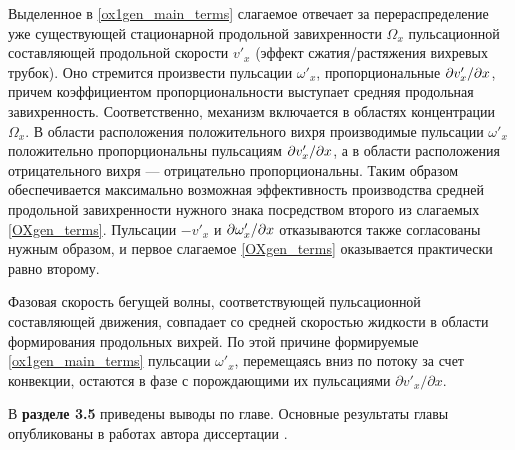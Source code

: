 Выделенное в \eqref{ox1gen_main_terms} слагаемое отвечает за перераспределение уже существующей стационарной продольной завихренности $\Omega_x$ пульсационной составляющей продольной скорости $v'_x$ (эффект сжатия/растяжения вихревых трубок). Оно стремится произвести пульсации $\omega'_x$, пропорциональные $\partial v'_x / \partial x$, причем коэффициентом пропорциональности выступает средняя продольная завихренность. Соответственно, механизм включается в областях концентрации~$\Omega_x$. В области расположения положительного вихря производимые пульсации $\omega'_x$ положительно пропорциональны пульсациям $\partial v'_x / \partial x$, а в области расположения отрицательного вихря --- отрицательно пропорциональны. Таким образом обеспечивается максимально возможная эффективность производства средней продольной завихренности нужного знака посредством второго из слагаемых \eqref{OXgen_terms}. Пульсации $-v'_x$ и $\partial \omega'_x / \partial x$ отказываются также согласованы нужным образом, и первое слагаемое \eqref{OXgen_terms} оказывается практически равно второму.

Фазовая скорость бегущей волны, соответствующей пульсационной составляющей движения, совпадает со средней скоростью жидкости в области формирования продольных вихрей. По этой причине формируемые \eqref{ox1gen_main_terms} пульсации $\omega'_x$, перемещаясь вниз по потоку за счет конвекции, остаются в фазе с порождающими их пульсациями $\partial v'_x / \partial x$.

В \textbf{разделе 3.5} приведены выводы по главе. Основные результаты главы опубликованы в работах автора диссертации  \cite{MZG2017, Lomonosov2018, Ob2018}.

 
